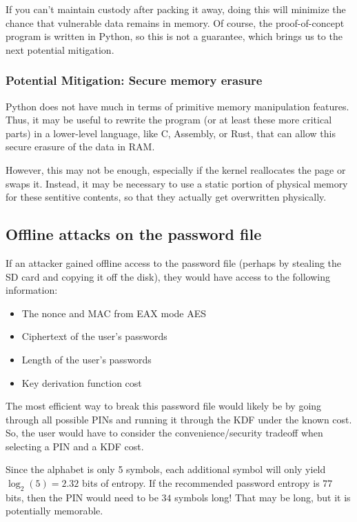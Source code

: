 \documentclass{article}
\begin{document}
If you can't maintain custody after packing it away, doing this will minimize the chance that vulnerable data remains in memory. Of course, the proof-of-concept program is written in Python, so this is not a guarantee, which brings us to the next potential mitigation.

\subsubsection{Potential Mitigation: Secure memory erasure}

Python does not have much in terms of primitive memory manipulation features. Thus, it may be useful to rewrite the program (or at least these more critical parts) in a lower-level language, like C, Assembly, or Rust, that can allow this secure erasure of the data in RAM.

However, this may not be enough, especially if the kernel reallocates the page or swaps it. Instead, it may be necessary to use a static portion of physical memory for these sentitive contents, so that they actually get overwritten physically.

\subsection{Offline attacks on the password file}

If an attacker gained offline access to the password file (perhaps by stealing the SD card and copying it off the disk), they would have access to the following information:

\begin{itemize}
    \item The nonce and MAC from EAX mode AES
    \item Ciphertext of the user's passwords
    \item Length of the user's passwords
    \item Key derivation function cost
\end{itemize}

The most efficient way to break this password file would likely be by going through all possible PINs and running it through the KDF under the known cost. So, the user would have to consider the convenience/security tradeoff when selecting a PIN and a KDF cost.

Since the alphabet is only 5 symbols, each additional symbol will only yield $\log_2(5) = 2.32$ bits of entropy. If the recommended password entropy is $77$ bits, then the PIN would need to be $34$ symbols long! That may be long, but it is potentially memorable.
\end{document}

